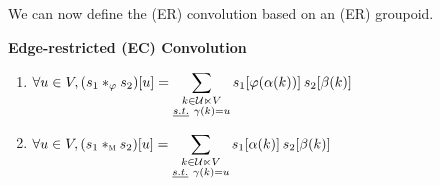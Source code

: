 We can now define the (ER) convolution based on an (ER) groupoid.

\begin{definition}\textbf{Edge-restricted (EC) Convolution}\\
\begin{enumerate}[label=(\roman*)]
\item $\forall u \in V, (s_1 \ast_\varphi s_2) [u] = \displaystyle\sum_{\substack{k \in \cu \ltimes V\\ \st \gamma(k)=u}} s_1[\varphi(\alpha(k))] \h{2} s_2[\beta(k)]$
\item $\forall u \in V, (s_1 \ast_{\M} s_2) [u] = \displaystyle\sum_{\substack{k \in \cu \ltimes V\\ \st \gamma(k)=u}} s_1[\alpha(k)] \h{2} s_2[\beta(k)]$
\end{enumerate}
\end{definition}

